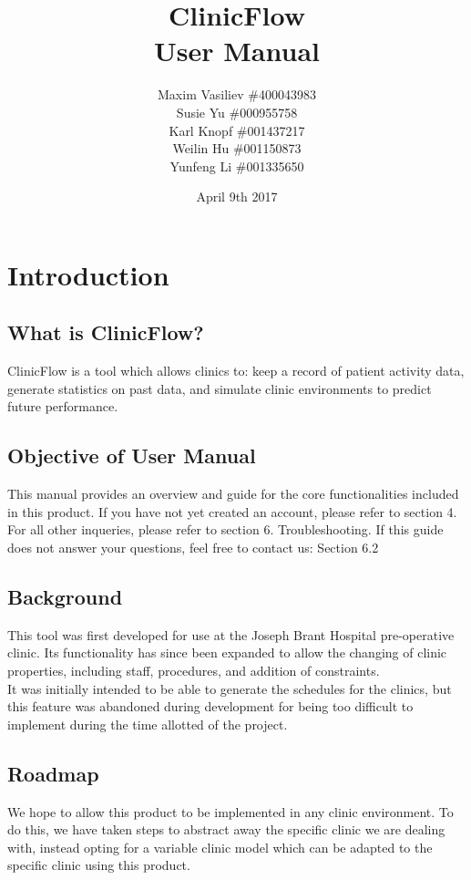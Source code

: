 \documentclass[12pt]{article}
\title{
ClinicFlow
\\\vspace{10mm}
\large \textbf{User Manual}
\vspace{40mm}
}
\author{ Maxim Vasiliev \#400043983\\
Susie Yu \#000955758\\
Karl Knopf \#001437217\\
Weilin Hu \#001150873\\
Yunfeng Li \#001335650
}
\date{April 9th 2017}
\begin{document}
\maketitle
\newpage
\tableofcontents
\listoffigures
\newpage
{}


\section{Introduction}

\subsection{What is ClinicFlow?}
ClinicFlow is a tool which allows clinics to: keep a record of patient activity data, generate statistics on past data, and simulate clinic environments to predict future performance. \\

\subsection{Objective of User Manual}
This manual provides an overview and guide for the core functionalities included in this product. If you have not yet created an account, please refer to section 4. \\
For all other inqueries, please refer to section 6. Troubleshooting. If this guide does not answer your questions, feel free to contact us: Section 6.2

\subsection{Background}
This tool was first developed for use at the Joseph Brant Hospital pre-operative clinic. Its functionality has since been expanded to allow the  changing of clinic properties, including staff, procedures, and addition of  constraints. \\ It was initially intended to be able to generate the schedules for the clinics, but this feature was abandoned during development for being too difficult to implement during the time allotted of the project. \\

\subsection{Roadmap}
We hope to allow this product to be implemented in any clinic environment. To do this, we have taken steps to abstract away the specific clinic we are dealing with, instead opting for a variable clinic model which can be adapted to the specific clinic using this product.
\end{document}
